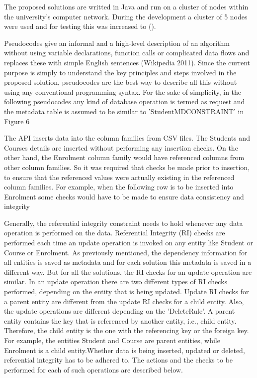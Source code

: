 The proposed solutions are writted in Java and run on a cluster
of nodes within the university's computer network. During the development a
cluster of 5 nodes were used and for testing this was increased to
().

Pseudocodes give an informal and a high-level description of an algorithm
without using variable declarations, function calls or complicated data flows
and replaces these with simple English sentences (Wikipedia 2011). Since the
current purpose is simply to understand the key principles and steps involved in
the proposed solution, pseudocodes are the best way to describe all this without
using any conventional programming syntax. For the sake of simplicity, in the
following pseudocodes any kind of database operation is termed as request and
the metadata table is assumed to be similar to 'StudentMDCONSTRAINT' in Figure
6

The API inserts data into the column families from CSV files. The Students and
Courses details are inserted without performing any insertion checks. On the
other hand, the Enrolment column family would have referenced columns from other
column families. So it was required that checks be made prior to insertion, to
ensure that the referenced values were actually existing in the referenced
column families. For example, when the following row is to be inserted into
Enrolment some checks would have to be made to ensure data consistency and
integrity

Generally, the referential integrity constraint needs to hold whenever any data
operation is performed on the data. Referential Integrity (RI) checks are
performed each time an update operation is invoked on any entity like Student or
Course or Enrolment. As previously mentioned, the dependency information for all
entities is saved as metadata and for each solution this metadata is saved in a
different way. But for all the solutions, the RI checks for an update operation
are similar.
In an update operation there are two different types of RI checks performed,
depending on the entity that is being updated. Update RI checks for a parent
entity are different from the update RI checks for a child entity. Also, the
update operations are different depending on the 'DeleteRule'.
A parent entity contains the key that is referenced by another entity, i.e.,
child entity. Therefore, the child entity is the one with the referencing key or
the foreign key. For example, the entities Student and Course are parent
entities, while Enrolment is a child entity.Whether data is being inserted,
updated or deleted, referential integrity has to be adhered to. The actions and
the checks to be performed for each of such operations are described below.

